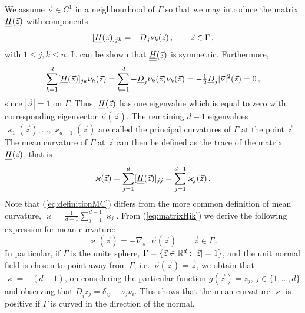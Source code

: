 We assume $\vec{\nu} \in C^1$ in a neighbourhood of $\Gamma$ so that we
may introduce the matrix $\mat H(\vec z)$ with components
\begin{equation}\label{eq:matrixHjk}
[\mat H (\vec z)]_{jk} = - \underline{D}_j \nu_k (\vec z)\,, \qquad \vec z \in
\Gamma \, ,
\end{equation}
with $1\leq j,k\leq n$. It can be shown that $\mat H(\vec z)$ is symmetric.
Furthermore,
\begin{equation}
\sum_{k = 1}^{d} [\mat H(\vec z)]_{jk} \nu_k (\vec z) =
\sum_{k = 1}^{d} - \underline{D}_j \nu_k (\vec z) \nu_k (\vec z) =
- \tfrac{1}{2} \underline{D}_j |\vec{\nu}|^2 (\vec z) = 0 \, ,
\end{equation}
since $|\vec{\nu}| = 1$ on $\Gamma$. Thus, $\mat H(\vec z)$ has one
eigenvalue which is equal to zero with corresponding eigenvector
$\vec\nu(\vec z)$. The remaining $d - 1$ eigenvalues $\varkappa_1 (\vec z),
\hdots, \varkappa_{d - 1} (\vec z)$ are called the principal curvatures of
$\Gamma$ at the point $\vec z$. The mean curvature of $\Gamma$ at $\vec z$
can then be defined as the trace of the matrix $\mat H(\vec z)$, that is
\begin{equation}\label{eq:definitionMC}
\varkappa (\vec z) = \sum_{j = 1}^{d} [\mat H(\vec z)]_{jj} = \sum_{j = 1}^{d -
1} \varkappa_j (\vec z) \,.
\end{equation}
Note that (\ref{eq:definitionMC}) differs from the more common
definition of mean curvature,
$\varkappa = \frac{1}{d - 1} \sum_{j = 1}^{d - 1} \varkappa_j$.
From (\ref{eq:matrixHjk}) we derive the following expression for mean
curvature:
\begin{equation}\label{eq:definition2MC}
\varkappa (\vec z)=-\nabla_s \,.\, \vec{\nu}(\vec z) \qquad \vec z \in \Gamma\,.
\end{equation}
In particular, if $\Gamma$ is the unite sphere,
$\Gamma = \{ \vec z \in {\mathbb R}^d : |\vec z| = 1 \}$,
and the unit normal field is chosen to point away from $\Gamma$,
i.e.~$\vec\nu(\vec z) = \vec z$, we obtain that $\varkappa = -
(d - 1)$, on considering the particular function $g(\vec z) = z_j$, $j \in \{
1, \hdots, d \}$ and observing that $\underline{D}_i z_j = \delta_{ij} - \nu_j
\nu_i$. This shows that the mean curvature $\varkappa$ is positive if $\Gamma$
is curved in the direction of the normal.

